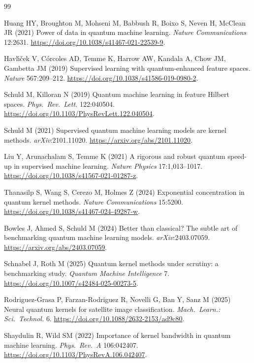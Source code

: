 \documentclass[pdflatex,sn-mathphys-num]{sn-jnl}
\theoremstyle{thmstyleone}
\theoremstyle{thmstyletwo}
\theoremstyle{thmstylethree}
\begin{document}
\begin{thebibliography}{99}

Huang HY, Broughton M, Mohseni M, Babbush R, Boixo S, Neven H, McClean JR (2021)
Power of data in quantum machine learning.
\textit{Nature Communications} 12:2631.
\url{https://doi.org/10.1038/s41467-021-22539-9}.

Havl{\'\i}{\v{c}}ek V, C{\'o}rcoles AD, Temme K, Harrow AW, Kandala A,
Chow JM, Gambetta JM (2019) Supervised learning with quantum-enhanced
feature spaces. \textit{Nature} 567:209--212.
\url{https://doi.org/10.1038/s41586-019-0980-2}.

Schuld M, Killoran N (2019) Quantum machine learning in feature Hilbert
spaces. \textit{Phys.\ Rev.\ Lett.} 122:040504.
\url{https://doi.org/10.1103/PhysRevLett.122.040504}.

Schuld M (2021) Supervised quantum machine learning models are kernel
methods. \textit{arXiv}:2101.11020.
\url{https://arxiv.org/abs/2101.11020}.

Liu Y, Arunachalam S, Temme K (2021) A rigorous and robust quantum
speed-up in supervised machine learning.
\textit{Nature Physics} 17:1{,}013--1017.
\url{https://doi.org/10.1038/s41567-021-01287-z}.

Thanasilp S, Wang S, Cerezo M, Holmes Z (2024) Exponential concentration
in quantum kernel methods. \textit{Nature Communications} 15:5200.
\url{https://doi.org/10.1038/s41467-024-49287-w}.

Bowles J, Ahmed S, Schuld M (2024) Better than classical? The subtle
art of benchmarking quantum machine learning models.
\textit{arXiv}:2403.07059.
\url{https://arxiv.org/abs/2403.07059}.

Schnabel J, Roth M (2025) Quantum kernel methods under scrutiny: a
benchmarking study. \textit{Quantum Machine Intelligence} 7.
\url{https://doi.org/10.1007/s42484-025-00273-5}.

Rodriguez-Grasa P, Farzan-Rodriguez R, Novelli G, Ban Y, Sanz M (2025)
Neural quantum kernels for satellite image classification.
\textit{Mach.\ Learn.: Sci.\ Technol.} 6.
\url{https://doi.org/10.1088/2632-2153/ad9c80}.

Shaydulin R, Wild SM (2022) Importance of kernel bandwidth in quantum
machine learning. \textit{Phys.\ Rev.\ A} 106:042407.
\url{https://doi.org/10.1103/PhysRevA.106.042407}.


\end{thebibliography}
\end{document}

